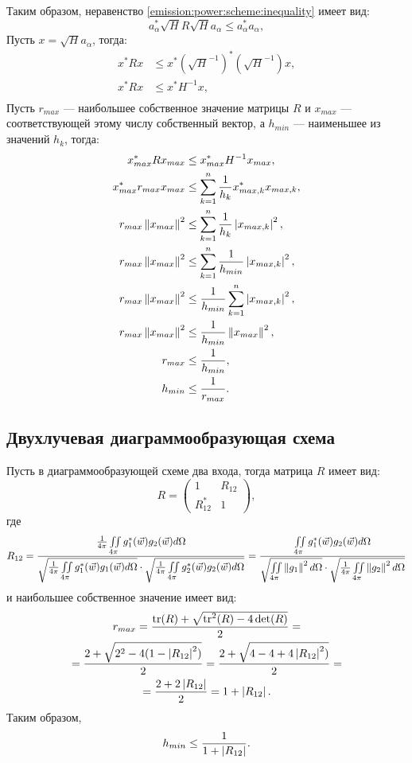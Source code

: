 Таким образом, неравенство \eqref{emission:power:scheme:inequality} имеет вид:
\[
    a_\alpha^* \sqrt{H} R \sqrt{H} a_\alpha \le a_\alpha^* a_\alpha ,
\]
Пусть $x = \sqrt{H} a_\alpha$, тогда:
\begin{align*}
    x^* R x & \le x^* (\sqrt{H}^{-1})^* (\sqrt{H}^{-1}) x , \\
    x^* R x & \le x^* H^{-1} x , \\
\end{align*}
Пусть $r_{max}$ --- наибольшее собственное значение матрицы $R$ и $x_{max}$ --- соответствующей этому числу собственный вектор, а $h_{min}$ --- наименьшее из
значений $h_k$, тогда:
\begin{align*}
    x_{max}^* R x_{max} & \le x_{max}^* H^{-1} x_{max} , \\
    x_{max}^* r_{max} x_{max} & \le \sum_{k=1}^n \frac{1}{h_k} x_{max,k}^* x_{max,k} , \\
    r_{max} \left \| x_{max} \right \|^2 & \le \sum_{k=1}^n \frac{1}{h_k} \left | x_{max,k} \right |^2 , \\
    r_{max} \left \| x_{max} \right \|^2 & \le \sum_{k=1}^n \frac{1}{h_{min}} \left | x_{max,k} \right |^2 , \\
    r_{max} \left \| x_{max} \right \|^2 & \le \frac{1}{h_{min}} \sum_{k=1}^n \left | x_{max,k} \right |^2 , \\
    r_{max} \left \| x_{max} \right \|^2 & \le \frac{1}{h_{min}} \left \| x_{max} \right \|^2 , \\
    r_{max} & \le \frac{1}{h_{min}} , \\
    h_{min} & \le \frac{1}{r_{max}} .
\end{align*}


\subsection{Двухлучевая диаграммообразующая схема}

Пусть в диаграммообразующей схеме два входа, тогда матрица $R$ имеет вид:
\[
    R
    = \begin{pmatrix}
          1        & R_{12} \\
          R_{12}^* & 1
    \end{pmatrix} ,
\]
где
\[
    R_{12}
    =
    \frac
    {\frac{1}{4 \pi} \iint \limits_{4 \pi} g_1^*(\vec{w}) g_2(\vec{w}) d \Omega}
    {\sqrt{\frac{1}{4 \pi} \iint \limits_{4 \pi} g_1^*(\vec{w}) g_1(\vec{w}) d \Omega} \cdot \sqrt{\frac{1}{4 \pi} \iint \limits_{4 \pi} g_2^*(\vec{w}) g_2(\vec{w}) d \Omega}}
    = \frac
    {\iint \limits_{4 \pi} g_1^*(\vec{w}) g_2(\vec{w}) d \Omega}
    {\sqrt{\iint \limits_{4 \pi} \left \| g_1 \right \|^2 d \Omega} \cdot \sqrt{\frac{1}{4 \pi} \iint \limits_{4 \pi} \left \| g_2 \right \|^2 d \Omega}}
\]
и наибольшее собственное значение имеет вид:
\begin{multline*}
    r_{max}
    = \frac{\operatorname{tr}(R) + \sqrt{\operatorname{tr}^2(R) - 4 \det(R)}}{2} = \\
    = \frac{2 + \sqrt{2^2 - 4 (1 - \left | R_{12} \right |^2)}}{2}
    = \frac{2 + \sqrt{4 - 4 + 4 \left | R_{12} \right |^2)}}{2} = \\
    = \frac{2 + 2 \left | R_{12} \right |}{2}
    = 1 + \left | R_{12} \right | .
\end{multline*}
Таким образом,
\[
    h_{min} \le \frac{1}{1 + \left | R_{12} \right |} .
\]
